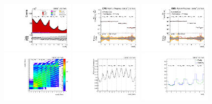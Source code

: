 \begin{refsection}
\begin{figure}[htb]
\begin{center}
 \includegraphics[width=0.32\textwidth]{fig_fullRun2UL/controlplots/combined/Hyp_LeptonBn_vs_TTBarMass.pdf}
 \includegraphics[width=0.32\textwidth]{fig_fullRun2UL/unfolding/combined/UnfoldedResults_b2n_mttbar.pdf}
 \includegraphics[width=0.32\textwidth]{fig_fullRun2UL/unfolding/combined/UnfoldedResultsNorm_b2n_mttbar.pdf} \\
 \includegraphics[width=0.32\textwidth]{fig_fullRun2UL/unfolding/combined/ResponseMatrix_b2n_mttbar.pdf}
 \includegraphics[width=0.32\textwidth]{fig_fullRun2UL/unfolding/combined/TotEff_b2n_mttbar.pdf}
 \includegraphics[width=0.32\textwidth]{fig_fullRun2UL/unfolding/combined/PurStab_b2n_mttbar.pdf} \\

\end{center}
\end{figure}
\end{refsection}
